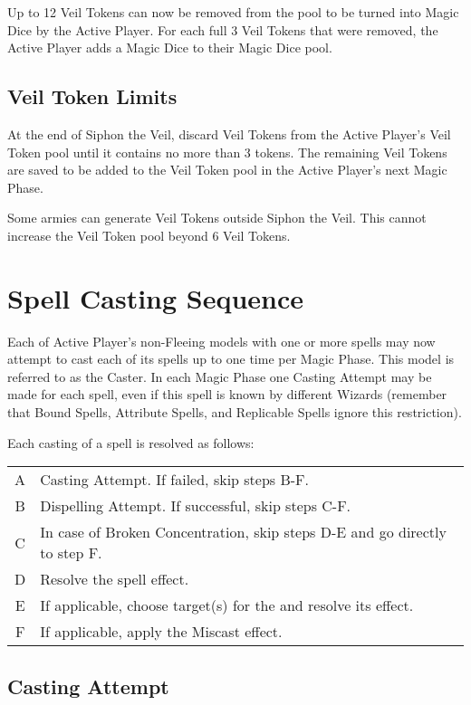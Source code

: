  Up to 12 Veil Tokens can now be removed from the pool to be turned into Magic Dice by the Active Player. For each full 3 Veil Tokens that were removed, the Active Player adds a Magic Dice to their Magic Dice pool. 

\subsection{Veil Token Limits}

At the end of Siphon the Veil, discard Veil Tokens from the Active Player's Veil Token pool until it contains no more than 3 tokens. The remaining Veil Tokens are saved to be added to the Veil Token pool in the Active Player's next Magic Phase.

Some armies can generate Veil Tokens outside Siphon the Veil. This cannot increase the Veil Token pool beyond 6 Veil Tokens.

\section{Spell Casting Sequence}
\label{spell_casting_sequence}

Each of Active Player's non-Fleeing models with one or more spells may now attempt to cast each of its spells up to one time per Magic Phase. This model is referred to as the Caster. In each Magic Phase one Casting Attempt may be made for each spell, even if this spell is known by different Wizards (remember that Bound Spells, Attribute Spells, and Replicable Spells ignore this restriction).

Each casting of a spell is resolved as follows:

\hspace*{0.3cm}
\begin{tabular}{c|m{14cm}}
A & Casting Attempt. If failed, skip steps B-F. \tabularnewline
B & Dispelling Attempt. If successful, skip steps C-F. \tabularnewline
C & In case of Broken Concentration, skip steps D-E and go directly to step F. \tabularnewline
D & Resolve the spell effect. \tabularnewline
E & If applicable, choose target(s) for the \attributespell{} and resolve its effect. \tabularnewline
F & If applicable, apply the Miscast effect. \tabularnewline
\end{tabular}

\subsection{Casting Attempt}


